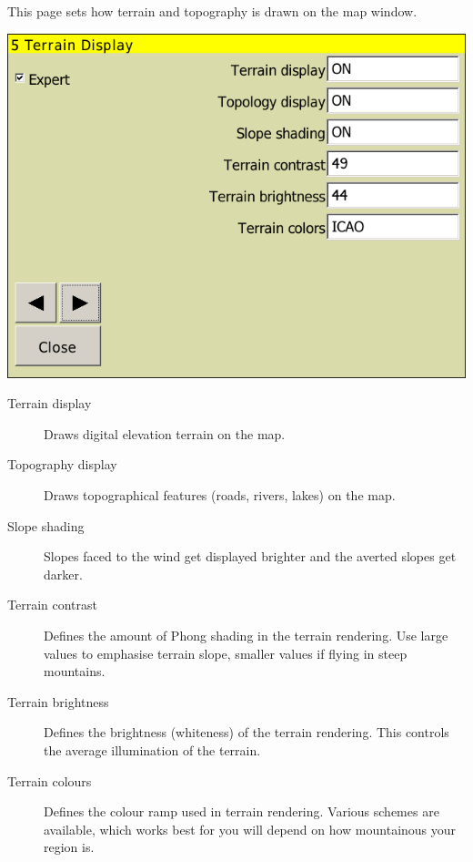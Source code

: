 This page sets how terrain and topography is drawn on the map window.

\begin{center}
\includegraphics[angle=0,width=0.8\linewidth,keepaspectratio='true']{figures/config-terrain.png}
\end{center}

\begin{description}
\item[Terrain display]  Draws digital elevation terrain on the map.
\item[Topography display]  Draws topographical features (roads, rivers, lakes) on
the map.
\item[Slope shading]  \label{conf:shading} Slopes faced to the wind get
displayed brighter and the averted slopes get darker.
\item[Terrain contrast]  Defines the amount of Phong shading in the terrain rendering.  Use large values 
to emphasise terrain slope, smaller values if flying in steep mountains.
\item[Terrain brightness]  Defines the brightness (whiteness) of the terrain rendering.  This controls the 
average illumination of the terrain.
\item[Terrain colours]  Defines the colour ramp used in terrain rendering.  Various schemes are available, 
which works best for you will depend on how mountainous your region is.
\end{description}


